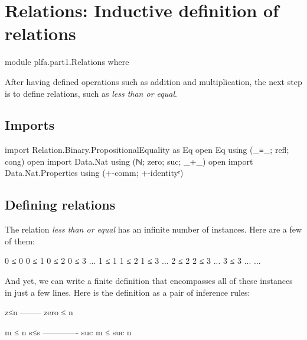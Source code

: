 \hypertarget{Relations}{%
\chapter{Relations: Inductive definition of relations}\label{Relations}}

\begin{fence}
\begin{code}
module plfa.part1.Relations where
\end{code}
\end{fence}

After having defined operations such as addition and multiplication, the
next step is to define relations, such as \emph{less than or equal}.

\hypertarget{imports}{%
\section{Imports}\label{imports}}

\begin{fence}
\begin{code}
import Relation.Binary.PropositionalEquality as Eq
open Eq using (_≡_; refl; cong)
open import Data.Nat using (ℕ; zero; suc; _+_)
open import Data.Nat.Properties using (+-comm; +-identityʳ)
\end{code}
\end{fence}

\hypertarget{defining-relations}{%
\section{Defining relations}\label{defining-relations}}

The relation \emph{less than or equal} has an infinite number of
instances. Here are a few of them:

\begin{myDisplay}
0 ≤ 0     0 ≤ 1     0 ≤ 2     0 ≤ 3     ...
          1 ≤ 1     1 ≤ 2     1 ≤ 3     ...
                    2 ≤ 2     2 ≤ 3     ...
                              3 ≤ 3     ...
                                        ...
\end{myDisplay}

And yet, we can write a finite definition that encompasses all of these
instances in just a few lines. Here is the definition as a pair of
inference rules:

\begin{myDisplay}
z≤n --------
    zero ≤ n

    m ≤ n
s≤s -------------
    suc m ≤ suc n
\end{myDisplay}

